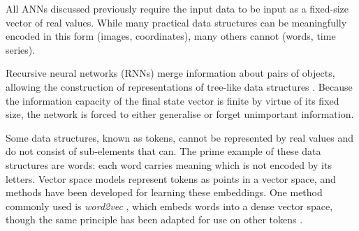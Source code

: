 \documentclass[../../main.tex]{subfiles}
\begin{document}
All ANNs discussed previously require the input data to be input as a fixed-size vector of real values.
While many practical data structures can be meaningfully encoded in this form (images, coordinates), many others cannot (words, time series).

Recursive neural networks (RNNs) merge information about pairs of objects, allowing the construction of representations of tree-like data structures \cite{socher11}.
Because the information capacity of the final state vector is finite by virtue of its fixed size, the network is forced to either generalise or forget unimportant information.

Some data structures, known as tokens, cannot be represented by real values and do not consist of sub-elements that can.
The prime example of these data structures are words: each word carries meaning which is not encoded by its letters.
Vector space models represent tokens as points in a vector space, and methods have been developed for learning these embeddings.
One method commonly used is \emph{word2vec} \cite{mikolov13}, which embeds words into a dense vector space, though the same principle has been adapted for use on other tokens \cite{le14}.
\end{document}
